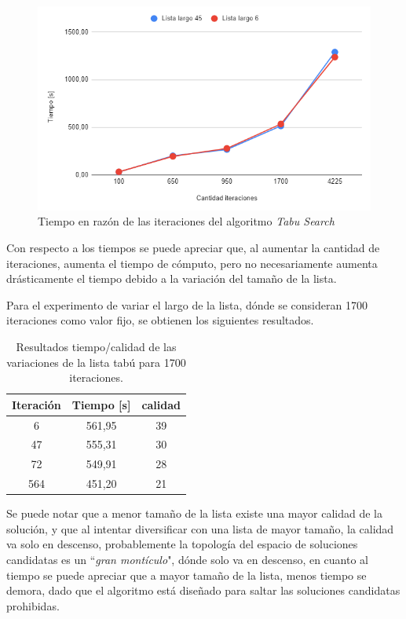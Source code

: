 \documentclass[letter, 10pt]{article}
\begin{document}
\begin{figure}[ht]
 \caption{Tiempo en razón de las iteraciones del algoritmo \textit{Tabu Search}}
\centering
\includegraphics[width=\textwidth]{iter_time.png}
\end{figure}
Con respecto a los tiempos se puede apreciar que, al aumentar la cantidad de iteraciones, aumenta el tiempo de cómputo, pero no necesariamente aumenta drásticamente el tiempo debido a la variación del tamaño de la lista.

\newpage
Para el experimento de variar el largo de la lista, dónde se consideran 1700 iteraciones como valor fijo, se obtienen los siguientes resultados.

\begin{table}[ht]
\centering
\begin{tabular}{|c|c|c|}
\hline
\multicolumn{1}{|l|}{Iteración} & \multicolumn{1}{l|}{Tiempo {[}s{]}} & \multicolumn{1}{l|}{calidad} \\ \hline
6   & 561,95 & 39 \\ \hline
47  & 555,31 & 30 \\ \hline
72  & 549,91 & 28 \\ \hline
564 & 451,20 & 21 \\ \hline
\end{tabular}
\caption{Resultados tiempo/calidad de las variaciones de la lista tabú para 1700 iteraciones.}
\label{table:tf}
\end{table}
Se puede notar que a menor tamaño de la lista existe una mayor calidad de la solución, y que al intentar diversificar con una lista de mayor tamaño, la calidad va solo en descenso, probablemente la topología del espacio de soluciones candidatas es un ``\textit{gran montículo}", dónde solo va en descenso, en cuanto al tiempo se puede apreciar que a mayor tamaño de la lista, menos tiempo se demora, dado que el algoritmo está diseñado para saltar las soluciones candidatas prohibidas.
\end{document}
